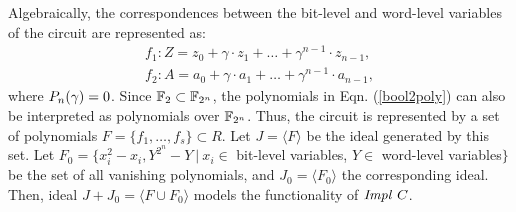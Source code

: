 
Algebraically, the correspondences between the bit-level and word-level
variables of the circuit are represented as:
\begin{equation}
\label{ip-word-level}
\begin{split}
 f_1: Z =  z_0 +\gamma \cdot  z_1 + \dots +\gamma^{n-1} \cdot z_{n-1},\\
 f_2: A =  a_0 +\gamma \cdot a_1 + \dots +\gamma^{n-1} \cdot a_{n-1},
\end{split}
\end{equation}
where $P_n(\gamma) =0$. Since ${\mathbb{F}}_2 \subset {\mathbb{F}}_{2^n}$, the polynomials in 
Eqn. (\ref{bool2poly}) can also be interpreted as polynomials over ${\mathbb{F}}_{2^n}$. 
Thus, the circuit is represented by a set of polynomials
$F=\{f_1,\dots,f_s\} \subset R$. Let $J =\langle F\rangle$ be the
ideal generated by this set.
Let $F_0 = \{x_i^2-x_i, Y^{2^n}-Y~|~x_i \in$ bit-level variables,
$Y \in$ word-level variables$\}$ be the set of all vanishing
polynomials, and $J_0 = \langle F_0\rangle$ the corresponding ideal.
Then, ideal $J+J_0 = \langle F \cup F_0\rangle$ models the functionality of
${\it Impl} ~C$. 

